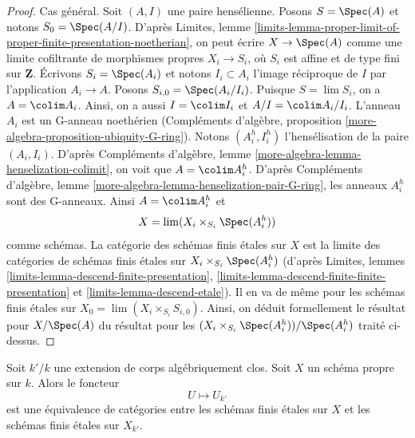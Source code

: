 \begin{proof}
\medskip\noindent
Cas général. Soit $(A, I)$ une paire hensélienne.
Posons $S = \Spec(A)$ et notons $S_0 = \Spec(A/I)$. D'après Limites, lemme
\ref{limits-lemma-proper-limit-of-proper-finite-presentation-noetherian},
on peut écrire $X \to \Spec(A)$ comme une limite cofiltrante de
morphismes propres $X_i \to S_i$, où $S_i$ est affine et de type fini
sur $\mathbf{Z}$. Écrivons $S_i = \Spec(A_i)$ et notons
$I_i \subset A_i$ l'image réciproque de $I$ par l'application $A_i \to A$.
Posons $S_{i, 0} = \Spec(A_i/I_i)$. Puisque $S = \lim S_i$, on a
$A = \colim A_i$. Ainsi, on a aussi $I = \colim I_i$ et $A/I = \colim A_i/I_i$.
L'anneau $A_i$ est un G-anneau noethérien (Compléments d'algèbre, proposition
\ref{more-algebra-proposition-ubiquity-G-ring}).
Notons $(A_i^h, I_i^h)$ l'hensélisation de la paire $(A_i, I_i)$.
D'après Compléments d'algèbre, lemme \ref{more-algebra-lemma-henselization-colimit},
on voit que $A = \colim A_i^h$. D'après
Compléments d'algèbre, lemme \ref{more-algebra-lemma-henselization-pair-G-ring},
les anneaux $A_i^h$ sont des G-anneaux. Ainsi $A = \colim A_i^h$ et
$$
X = \lim (X_i \times_{S_i} \Spec(A_i^h))
$$
comme schémas. La catégorie des schémas finis étales sur $X$ est la limite
des catégories de schémas finis étales sur
$X_i \times_{S_i} \Spec(A_i^h)$ (d'après
Limites, lemmes
\ref{limits-lemma-descend-finite-presentation},
\ref{limits-lemma-descend-finite-finite-presentation} et
\ref{limits-lemma-descend-etale}).
Il en va de même pour les schémas finis étales sur
$X_0 = \lim (X_i \times_{S_i} S_{i, 0})$.
Ainsi, on déduit formellement le résultat pour $X / \Spec(A)$
du résultat pour les $(X_i \times_{S_i} \Spec(A_i^h)) / \Spec(A_i^h)$
traité ci-dessus.
\end{proof}

\begin{lemma}
\label{lemma-finite-etale-invariant-over-proper}
Soit $k'/k$ une extension de corps algébriquement clos.
Soit $X$ un schéma propre sur $k$. Alors le foncteur
$$
U \longmapsto U_{k'}
$$
est une équivalence de catégories entre les schémas finis étales sur
$X$ et les schémas finis étales sur $X_{k'}$.
\end{lemma}

